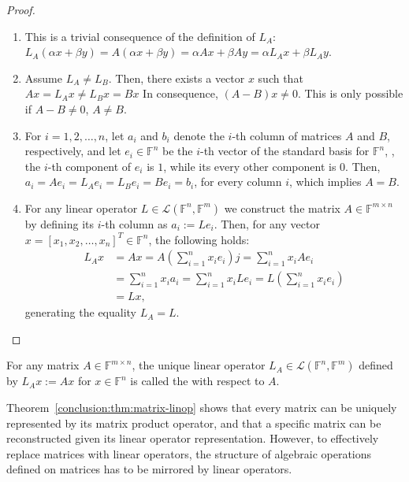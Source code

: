 \begin{proof}\leavevmode
\begin{enumerate}
\item This is a trivial consequence of the definition of $L_A$: $L_A(\alpha x +
\beta y) = A(\alpha x + \beta y) = \alpha Ax + \beta Ay = \alpha L_Ax + \beta
L_Ay$.
\item Assume $L_A \neq L_B$. Then, there exists a vector $x$ such that $Ax =
L_Ax \neq L_B x = Bx$ In consequence, $(A - B)x \neq 0$. This is only
possible if $A - B \neq 0$, \ie $A \neq B$.
\item For $i = 1,2, \ldots, n$, let $a_i$ and $b_i$ denote the $i$-th column of
matrices $A$ and $B$, respectively, and let $e_i \in \mathbb{F}^n$ be the $i$-th
vector of the standard basis for $\mathbb{F}^n$, \ie, the $i$-th component of
$e_i$ is $1$, while its every other component is $0$. Then, $a_i = Ae_i = L_Ae_i
= L_B e_i = Be_i = b_i$, for every column $i$, which implies $A = B$.
\item For any linear operator $L \in \mathcal{L}(\mathbb{F}^n, \mathbb{F}^m)$ we
construct the matrix $A \in \mathbb{F}^{m \times n}$ by defining its $i$-th
column as $a_i := Le_i$. Then, for any vector $x = [ x_1, x_2, \ldots, x_n ]^T 
\in \mathbb{F}^n$, the following holds:
\begin{align}
L_Ax &= Ax = A(\sum_{i=1}^n x_i e_i) j = \sum_{i=1}^n x_i Ae_i \nonumber \\
     &= \sum_{i=1}^n x_i a_i = \sum_{i=1}^n x_i Le_i
      = L(\sum_{i=1}^n x_i e_i) \label{conclusion:eqn:surjection} \\
     &= Lx, \nonumber
\end{align}
generating the equality $L_A = L$.
\end{enumerate}
\end{proof}

\begin{definition}
For any matrix $A \in \mathbb{F}^{m \times n}$, the unique linear operator $L_A
\in \mathcal{L}(\mathbb{F}^n, \mathbb{F}^m)$ defined by $L_Ax := Ax$ for $x \in
\mathbb{F}^n$ is called the  with respect
to $A$.
\end{definition}

Theorem~\ref{conclusion:thm:matrix-linop} shows that every matrix can be
uniquely represented by its matrix product operator, and that a specific matrix
can be reconstructed given its linear operator representation. However, to
effectively replace matrices with linear operators, the structure of algebraic
operations defined on matrices has to be mirrored by linear operators.

